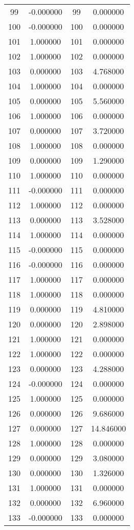 \documentclass[12pt]{article}
\begin{document}
\begin{longtable}{@{}cccc@{}}
99 & -0.000000 & 99 & 0.000000 \\
100 & -0.000000 & 100 & 0.000000 \\
101 & 1.000000 & 101 & 0.000000 \\
102 & 1.000000 & 102 & 0.000000 \\
103 & 0.000000 & 103 & 4.768000 \\
104 & 1.000000 & 104 & 0.000000 \\
105 & 0.000000 & 105 & 5.560000 \\
106 & 1.000000 & 106 & 0.000000 \\
107 & 0.000000 & 107 & 3.720000 \\
108 & 1.000000 & 108 & 0.000000 \\
109 & 0.000000 & 109 & 1.290000 \\
110 & 1.000000 & 110 & 0.000000 \\
111 & -0.000000 & 111 & 0.000000 \\
112 & 1.000000 & 112 & 0.000000 \\
113 & 0.000000 & 113 & 3.528000 \\
114 & 1.000000 & 114 & 0.000000 \\
115 & -0.000000 & 115 & 0.000000 \\
116 & -0.000000 & 116 & 0.000000 \\
117 & 1.000000 & 117 & 0.000000 \\
118 & 1.000000 & 118 & 0.000000 \\
119 & 0.000000 & 119 & 4.810000 \\
120 & 0.000000 & 120 & 2.898000 \\
121 & 1.000000 & 121 & 0.000000 \\
122 & 1.000000 & 122 & 0.000000 \\
123 & 0.000000 & 123 & 4.288000 \\
124 & -0.000000 & 124 & 0.000000 \\
125 & 1.000000 & 125 & 0.000000 \\
126 & 0.000000 & 126 & 9.686000 \\
127 & 0.000000 & 127 & 14.846000 \\
128 & 1.000000 & 128 & 0.000000 \\
129 & 0.000000 & 129 & 3.080000 \\
130 & 0.000000 & 130 & 1.326000 \\
131 & 1.000000 & 131 & 0.000000 \\
132 & 0.000000 & 132 & 6.960000 \\
133 & -0.000000 & 133 & 0.000000 \\

\end{longtable}
\end{document}
